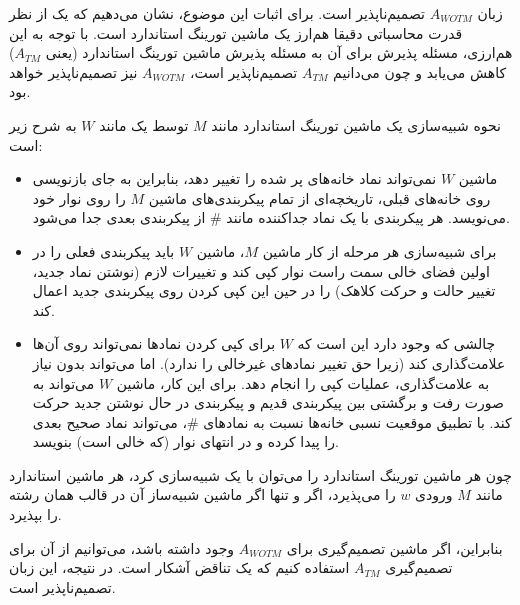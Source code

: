  زبان $A_{WOTM}$ {تصمیم‌ناپذیر} است.
برای اثبات این موضوع، نشان می‌دهیم که یک  از نظر قدرت محاسباتی دقیقا هم‌ارز یک ماشین تورینگ استاندارد است. با توجه به این هم‌ارزی، مسئله پذیرش برای آن به مسئله پذیرش ماشین تورینگ استاندارد (یعنی $A_{TM}$) کاهش می‌یابد و چون می‌دانیم $A_{TM}$ تصمیم‌ناپذیر است، $A_{WOTM}$ نیز تصمیم‌ناپذیر خواهد بود.

نحوه شبیه‌سازی یک ماشین تورینگ استاندارد مانند $M$ توسط یک  مانند $W$ به شرح زیر است:
\begin{itemize}
    \item ماشین $W$ نمی‌تواند نماد خانه‌های پر شده را تغییر دهد، بنابراین به جای بازنویسی روی خانه‌های قبلی، تاریخچه‌ای از تمام پیکربندی‌های ماشین $M$ را روی نوار خود می‌نویسد. هر پیکربندی با یک نماد جداکننده مانند $\#$ از پیکربندی بعدی جدا می‌شود.
    
    \item برای شبیه‌سازی هر مرحله از کار ماشین $M$، ماشین $W$ باید پیکربندی فعلی را در اولین فضای خالی سمت راست نوار کپی کند و تغییرات لازم (نوشتن نماد جدید، تغییر حالت و حرکت کلاهک) را در حین این کپی کردن روی پیکربندی جدید اعمال کند.
    
    \item چالشی که وجود دارد این است که $W$ برای کپی کردن نمادها نمی‌تواند روی آن‌ها علامت‌گذاری کند (زیرا حق تغییر نمادهای غیرخالی را ندارد). اما می‌تواند بدون نیاز به علامت‌گذاری، عملیات کپی را انجام دهد. برای این کار، ماشین $W$ می‌تواند به صورت رفت و برگشتی بین پیکربندی قدیم و پیکربندی در حال نوشتن جدید حرکت کند. با تطبیق موقعیت نسبی خانه‌ها نسبت به نمادهای $\#$، می‌تواند نماد صحیح بعدی را پیدا کرده و در انتهای نوار (که خالی است) بنویسد.
\end{itemize}

چون هر ماشین تورینگ استاندارد را می‌توان با یک  شبیه‌سازی کرد، هر ماشین استاندارد مانند $M$ ورودی $w$ را می‌پذیرد، اگر و تنها اگر ماشین شبیه‌ساز آن در قالب  همان رشته را بپذیرد. 

بنابراین، اگر ماشین تصمیم‌گیری برای $A_{WOTM}$ وجود داشته باشد، می‌توانیم از آن برای تصمیم‌گیری $A_{TM}$ استفاده کنیم که یک تناقض آشکار است. در نتیجه، این زبان تصمیم‌ناپذیر است.
